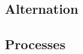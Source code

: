 \documentclass[11pt,oneside,a4paper]{article}
\newcommand{\missing}[1]{
\begin{tabular}{|p{11cm}|}
\hline
\emph{Missing:} {\scriptsize (things that need to be written or considered)} \\
\hline
#1
\hline
\end{tabular}
}
\begin{document}
% 
% 


\subsection{Alternation}


\subsection{Processes}
\end{document}
